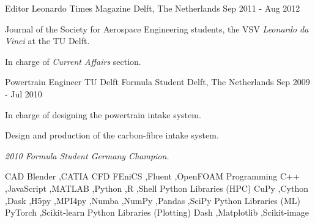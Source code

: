 \documentclass[11pt, a4paper]{preamble/awesome-cv-novo}
\begin{document}


\begin{cventries}

  \cventry
    {Editor} %
    {Leonardo Times Magazine} %
    {Delft, The Netherlands} %
    {Sep 2011 - Aug 2012} %
    {
      \begin{cvitems} %
        \item {Journal of the Society for Aerospace Engineering students, the VSV \textit{Leonardo da Vinci} at the TU Delft.}
        \item {In charge of \textit{Current Affairs} section.}
      \end{cvitems}
    }

  \cventry
    {Powertrain Engineer}
    {TU Delft Formula Student}
    {Delft, The Netherlands}
    {Sep 2009 - Jul 2010}
    {
      \begin{cvitems}
        \item {In charge of designing the powertrain intake system.}
        \item {Design and production of the carbon-fibre intake system.}
        \item {\textit{2010 Formula Student Germany Champion.}}
      \end{cvitems}
    }

\end{cventries}





  \begin{cvskills}
    \cvskill
      {CAD}
      {Blender \sep CATIA}
    \cvskill
      {CFD}
      {FEniCS \sep Fluent \sep OpenFOAM}
    \cvskill
      {Programming}
      {C++ \sep JavaScript \sep MATLAB \sep Python \sep R \sep Shell}
    \cvskill
      {Python Libraries (HPC)}
      {CuPy \sep Cython \sep Dask \sep H5py \sep MPI4py \sep Numba \sep NumPy \sep Pandas \sep SciPy}
    \cvskill
      {Python Libraries (ML)}
      {PyTorch \sep Scikit-learn}
    \cvskill
      {Python Libraries (Plotting)}
      {Dash \sep Matplotlib \sep Scikit-image}
  \end{cvskills}
\end{document}

